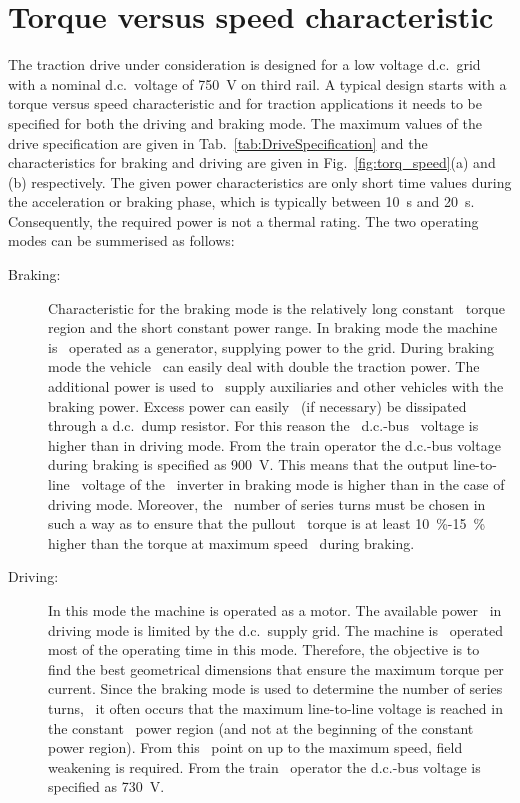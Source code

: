 \section{Torque versus speed characteristic}
The traction drive under consideration is designed for a low voltage d.c.~grid with a nominal d.c.~voltage of \SI{750}{V} on third rail. A typical design starts with a torque versus speed characteristic and for traction applications it needs to be specified for both the driving and braking mode. The maximum values of the drive specification are given in Tab.~\ref{tab:DriveSpecification} and the characteristics for braking and driving are given in Fig.~\ref{fig:torq_speed}(a) and (b) respectively. The given power characteristics are only short time values during the acceleration or braking phase, which is typically between \SI{10}{s} and \SI{20}{s}. Consequently, the required power is not a thermal rating. The two operating modes can be summerised as follows:
\begin{description}
	\item[Braking:] Characteristic for the braking mode is the relatively long constant~%
  torque region and the short constant power range. In braking mode the machine is~%
  operated as a generator, supplying power to the grid. During braking mode the vehicle~%
  can easily deal with double the traction power. The additional power is used to~%
  supply auxiliaries and other vehicles with the braking power. Excess power can easily~%
  (if necessary) be dissipated through a d.c.~dump resistor. For this reason the~%
  d.c.-bus~%
  voltage is higher than in driving mode. From the train operator the d.c.-bus voltage~%
  during braking is specified as \SI{900}{V}. This means that the output line-to-line~%
  voltage of the~%
  inverter in braking mode is higher than in the case of driving mode. Moreover, the~%
  number of series turns must be chosen in such a way as to ensure that the pullout~%
  torque is at least \SI{10}{\%}-\SI{15}{\%} higher than the torque at maximum speed~%
  during braking. 
	\item[Driving:] In this mode the machine is operated as a motor. The available power~%
	in driving mode is limited by the d.c.~supply grid. The machine is~%
	operated most of the operating time in this mode. Therefore, the objective is to~%
	find the best geometrical dimensions that ensure the maximum torque per~%
	current. Since the braking mode is used to determine the number of series turns,~%
	it often occurs that the maximum line-to-line voltage is reached in the constant~%
	power region (and not at the beginning of the constant power region). From this~%
	point on up to the maximum speed, field weakening is required. From the train~%
	operator the d.c.-bus voltage is specified as \SI{730}{V}.  
\end{description}
